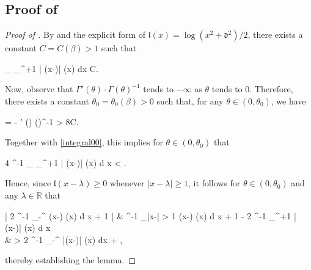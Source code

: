 \documentclass{amsart}
\numberwithin{equation}{section}
\theoremstyle{remark}
\theoremstyle{definition}
\begin{document}
		
	
	\subsection{Proof of }
	
	\label{IntegralEstimate} 
	
	
	\begin{proof}[Proof of ]
		
		By  and the explicit form of $\mathfrak{l} (x) = \log (x^2 + \mathfrak{d}^2)/2$, there exists a constant $C = C(\beta) > 1$ such that
		\begin{flalign}
			\label{integral00} 
			\displaystyle\sup_{\lambda \in {}} \displaystyle\int_{}^{\lambda+1} | (x-\lambda)| \varrho (x) dx \le C.
		\end{flalign}
		
		\noindent Now, observe that $\Gamma' (\theta) \cdot \Gamma (\theta)^{-1}$ tends to $-\infty$ as $\theta$ tends to $0$. Therefore, there exists a constant $\theta_0 = \theta_0 (\beta) > 0$ such that, for any $\theta \in (0, \theta_0)$, we have 
		\begin{flalign*}
			\alpha = \log \beta - \Gamma' (\theta) \cdot \Gamma (\theta)^{-1} > 8C.
		\end{flalign*}
		
		\noindent Together with \eqref{integral00}, this implies for $\theta \in (0, \theta_0)$ that 
		\begin{flalign*}
			4 \alpha^{-1} \cdot \displaystyle\sup_{\lambda \in {}} \displaystyle\int_{}^{\lambda+1} | (x-\lambda)| \varrho (x) d x  < \displaystyle\frac{1}{2}.
		\end{flalign*} 
	
		\noindent Hence, since $\mathfrak{l}(x-\lambda) \ge 0$ whenever $|x-\lambda| \ge 1$, it follows for $\theta \in (0, \theta_0)$ and any $\lambda \in \mathbb{R}$ that
		\begin{flalign*}
			\Bigg| 2 \alpha^{-1} \displaystyle\int_{-\infty}^{\infty}  (x-\lambda) \varrho (x) d x + 1 \Bigg| &  \alpha^{-1} \displaystyle\int_{|x-\lambda| > 1}  (x-\lambda) \varrho (x) d x + 1 -  2 \alpha^{-1} \displaystyle\int_{}^{\lambda+1} | (x-\lambda)| \varrho (x) d x  \\
			& >  2 \alpha^{-1} \displaystyle\int_{-\infty}^{\infty} |(x-\lambda)| \varrho (x) dx  + ,
		\end{flalign*}
		
		\noindent thereby establishing the lemma.
	\end{proof}
	
\end{document}
